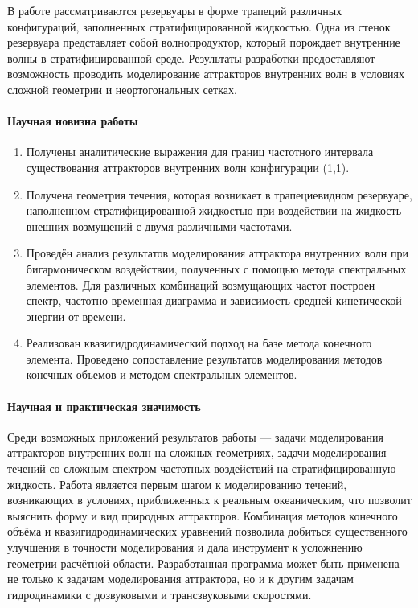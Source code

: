В работе рассматриваются резервуары в форме трапеций различных конфигураций, заполненных стратифицированной жидкостью. Одна из стенок резервуара представляет собой волнопродуктор, который порождает внутренние волны в стратифицированной среде. Результаты разработки предоставляют возможность проводить моделирование аттракторов внутренних волн в условиях сложной геометрии и неортогональных сетках. 

\paragraph{Научная новизна работы}

\begin{enumerate}[1.]

  \item Получены аналитические выражения для границ частотного интервала существования аттракторов внутренних волн конфигурации (1,1). 
    
  \item Получена геометрия течения, которая возникает в трапециевидном резервуаре, наполненном стратифицированной жидкостью при воздействии на жидкость внешних возмущений с двумя различными частотами. 
    
  \item Проведён анализ результатов моделирования аттрактора внутренних волн при бигармоническом воздействии, полученных с помощью метода спектральных элементов. Для различных комбинаций возмущающих частот построен спектр, частотно-временная диаграмма и зависимость средней кинетической энергии от времени. 
    
  \item Реализован квазигидродинамический подход на базе метода конечного элемента. Проведено сопоставление результатов моделирования методов конечных объемов и методом спектральных элементов.
    
\end{enumerate}

\paragraph{Научная и практическая значимость}


Среди возможных приложений результатов работы — задачи моделирования аттракторов внутренних волн на сложных геометриях, задачи моделирования течений со сложным спектром частотных воздействий на стратифицированную жидкость. Работа является первым шагом к моделированию течений, возникающих в условиях, приближенных к реальным океаническим, что позволит выяснить форму и вид природных аттракторов.  Комбинация методов конечного объёма и квазигидродинамических уравнений позволила добиться существенного улучшения в точности моделирования и дала инструмент к  усложнению геометрии расчётной области. Разработанная программа может быть применена не только к задачам моделирования аттрактора, но и к другим задачам гидродинамики с дозвуковыми и трансзвуковыми скоростями.

